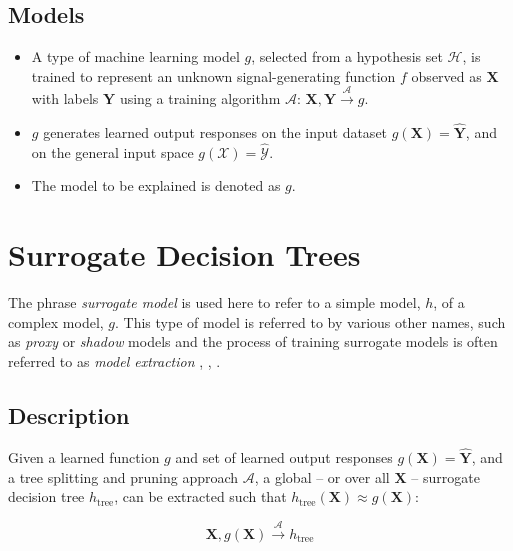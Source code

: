 \documentclass[11pt]{asaproc}
\begin{document}
\subsection{Models}

	\begin{itemize}
		\item A type of machine learning model $g$, selected from a hypothesis set $\mathcal{H}$, is trained to represent an unknown signal-generating function $f$ observed as  $\mathbf{X}$ with labels $\mathbf{Y}$ using a training algorithm $\mathcal{A}$: 
		$ \mathbf{X}, \mathbf{Y} \xrightarrow{\mathcal{A}} g$.
		\item $g$ generates learned output responses on the input dataset $g(\mathbf{X}) = \mathbf{\hat{Y}}$, and on the general input space $g(\mathcal{X}) = \mathcal{\hat{Y}}$.
		\item The model to be explained is denoted as $g$.
	\end{itemize}

\section{Surrogate Decision Trees} \label{sec:surrogate_dt}


The phrase \textit{surrogate model} is used here to refer to a simple model, $h$, of a complex model, $g$. This type of model is referred to by various other names, such as \textit{proxy} or \textit{shadow} models and the process of training surrogate models is often referred to as \textit{model extraction} \cite{dt_surrogate1}, \cite{ff_interpretability},  \cite{dt_surrogate2}. 

\subsection{Description}

Given a learned function $g$ and set of learned output responses $g(\mathbf{X}) = \mathbf{\hat{Y}}$, and a tree splitting and pruning approach $\mathcal{A}$, a global -- or over all $\mathbf{X}$ -- surrogate decision tree $h_{\text{tree}}$, can be extracted such that $h_{\text{tree}}(\mathbf{X}) \approx g(\mathbf{X})$:

\begin{equation}
\mathbf{X}, g(\mathbf{X}) \xrightarrow{\mathcal{A}} h_{\text{tree}}
\end{equation}
\end{document}
